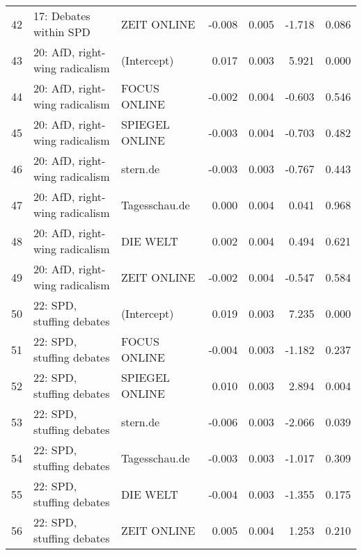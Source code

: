 \begin{table}[ht]
\begin{tabular}{rllrrrr}
  42 & 17: Debates within SPD & ZEIT ONLINE & -0.008 & 0.005 & -1.718 & 0.086 \\ 
  43 & 20: AfD, right-wing radicalism & (Intercept) & 0.017 & 0.003 & 5.921 & 0.000 \\ 
  44 & 20: AfD, right-wing radicalism & FOCUS ONLINE & -0.002 & 0.004 & -0.603 & 0.546 \\ 
  45 & 20: AfD, right-wing radicalism & SPIEGEL ONLINE & -0.003 & 0.004 & -0.703 & 0.482 \\ 
  46 & 20: AfD, right-wing radicalism & stern.de & -0.003 & 0.003 & -0.767 & 0.443 \\ 
  47 & 20: AfD, right-wing radicalism & Tagesschau.de & 0.000 & 0.004 & 0.041 & 0.968 \\ 
  48 & 20: AfD, right-wing radicalism & DIE WELT & 0.002 & 0.004 & 0.494 & 0.621 \\ 
  49 & 20: AfD, right-wing radicalism & ZEIT ONLINE & -0.002 & 0.004 & -0.547 & 0.584 \\ 
  50 & 22: SPD, stuffing debates & (Intercept) & 0.019 & 0.003 & 7.235 & 0.000 \\ 
  51 & 22: SPD, stuffing debates & FOCUS ONLINE & -0.004 & 0.003 & -1.182 & 0.237 \\ 
  52 & 22: SPD, stuffing debates & SPIEGEL ONLINE & 0.010 & 0.003 & 2.894 & 0.004 \\ 
  53 & 22: SPD, stuffing debates & stern.de & -0.006 & 0.003 & -2.066 & 0.039 \\ 
  54 & 22: SPD, stuffing debates & Tagesschau.de & -0.003 & 0.003 & -1.017 & 0.309 \\ 
  55 & 22: SPD, stuffing debates & DIE WELT & -0.004 & 0.003 & -1.355 & 0.175 \\ 
  56 & 22: SPD, stuffing debates & ZEIT ONLINE & 0.005 & 0.004 & 1.253 & 0.210 \\ 
   \hline
\end{tabular}
\end{table}
